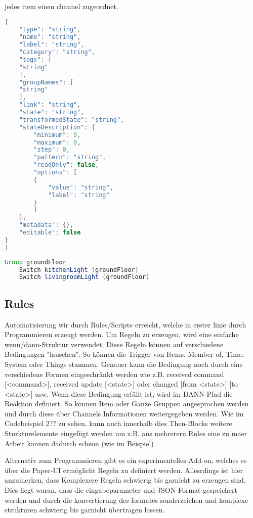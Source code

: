 jedes item einen channel zugeordnet. 
\begin{lstlisting}[language=java,firstnumber=1,caption=Item Beispiel,label=lst:sample-item]
{
	"type": "string",
	"name": "string",
	"label": "string",
	"category": "string",
	"tags": [
	"string"
	],
	"groupNames": [
	"string"
	],
	"link": "string",
	"state": "string",
	"transformedState": "string",
	"stateDescription": {
		"minimum": 0,
		"maximum": 0,
		"step": 0,
		"pattern": "string",
		"readOnly": false,
		"options": [
		{
			"value": "string",
			"label": "string"
		}
		]
	},
	"metadata": {},
	"editable": false
}
]
\end{lstlisting}

\begin{lstlisting}[language=java,firstnumber=1,caption=Item-Gruppierung Beispiel,label=lst:group-items]
	Group groundFloor
	Switch kitchenLight (groundFloor)
	Switch livingroomLight (groundFloor)
\end{lstlisting}

\subsection{Rules}
Automatisierung wir durch Rules/Scripte erreicht, welche in erster linie durch Programmieren erzeugt werden. Um Regeln zu erzeugen, wird eine einfache wenn/dann-Struktur verwendet. Diese Regeln können auf verschiedene Bedingungen "lauschen". So können die Trigger von Items, Member of, Time, System oder Things stammen. Genauer kann die Bedingung noch durch eine verschiedene Formen eingeschränkt werden wie z.B. received command [<command>],  received update [<state>] oder changed [from <state>] [to <state>] usw.
Wenn diese Bedingung erfüllt ist, wird im DANN-Pfad die Reaktion definiert. So können Item oder Ganze Gruppen angesprochen werden und durch diese über Channels Informationen weitergegeben werden.
Wie im Codebeispiel 2?? zu sehen, kann auch innerhalb dies Then-Blocks weitere Sturkturelemente eingefügt werden um z.B. aus mehrerern Rules eine zu maer Arbeit können dadurch scheon (wie im Beispiel)

Alternativ zum Programmieren gibt es ein experimentelles Add-on, welches es über die Paper-UI ermöglicht Regeln zu definiert werden. Allesrdings ist hier anzumerken, dass Komplexere Regeln schwierig bis garnicht zu erzeugen sind. Dies liegt waran, dass die eingabeparameter und JSON-Format gespeichert werden und durch die konvertierung des formates sonderzeichen und komplexe strukturen schwierig bis garnicht übertragen lassen.

